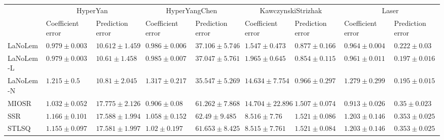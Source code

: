 \begin{table*}
{\begin{tabular}{lllllllll}
 & \multicolumn{2}{c}{HyperYan} & \multicolumn{2}{c}{HyperYangChen} & \multicolumn{2}{c}{KawczynskiStrizhak} & \multicolumn{2}{c}{Laser} \\
 & Coefficient error & Prediction error & Coefficient error & Prediction error & Coefficient error & Prediction error & Coefficient error & Prediction error \\
\midrule
LaNoLem & $0.979\pm 0.003$ & $10.612\pm 1.459$ & $0.986\pm 0.006$ & $37.106\pm 5.746$ & $\mathbf{1.547}\pm 0.473$ & $0.877\pm 0.166$ & $0.964\pm 0.004$ & $0.222\pm 0.03$ \\
LaNoLem-L & $\mathbf{0.979}\pm 0.003$ & $\mathbf{10.61}\pm 1.458$ & $0.985\pm 0.007$ & $37.047\pm 5.761$ & $1.965\pm 0.645$ & $\mathbf{0.854}\pm 0.115$ & $0.961\pm 0.011$ & $0.197\pm 0.016$ \\
LaNoLem-N & $1.215\pm 0.5$ & $10.81\pm 2.045$ & $1.317\pm 0.217$ & $\mathbf{35.547}\pm 5.269$ & $14.634\pm 7.754$ & $0.966\pm 0.297$ & $1.279\pm 0.299$ & $\mathbf{0.195}\pm 0.015$ \\
MIOSR & $1.032\pm 0.052$ & $17.775\pm 2.126$ & $\mathbf{0.906}\pm 0.08$ & $61.262\pm 7.868$ & $14.704\pm 22.896$ & $1.507\pm 0.074$ & $\mathbf{0.913}\pm 0.026$ & $0.35\pm 0.023$ \\
SSR & $1.166\pm 0.101$ & $17.588\pm 1.994$ & $1.058\pm 0.152$ & $62.49\pm 9.485$ & $8.516\pm 7.76$ & $1.521\pm 0.086$ & $1.203\pm 0.146$ & $0.353\pm 0.025$ \\
STLSQ & $1.155\pm 0.097$ & $17.581\pm 1.997$ & $1.02\pm 0.197$ & $61.653\pm 8.425$ & $8.515\pm 7.761$ & $1.521\pm 0.084$ & $1.203\pm 0.146$ & $0.353\pm 0.025$ \\

\midrule


\end{tabular}}
\end{table*}
